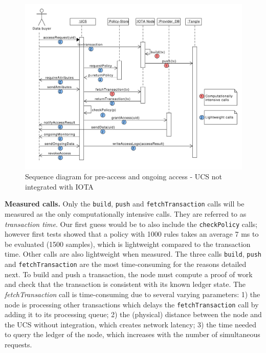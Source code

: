 \begin{figure}[ht]
\centering
 \includegraphics[width=\textwidth]{Images/sequence_iotj.pdf}
\caption{Sequence diagram for pre-access and ongoing access - UCS not integrated with IOTA}
\label{F_sequence_iotj}
\end{figure}

\textbf{Measured calls.}
Only the \texttt{build}, \texttt{push} and \texttt{fetchTransaction} calls will be measured as the only computationally intensive calls. They are referred to as \emph{transaction time}. Our first guess would be to also include
the \texttt{checkPolicy} calls; however first tests showed that a
policy with 1000 rules takes an average 7 ms to be evaluated (1500 samples), which is lightweight compared to the transaction time. Other calls are also lightweight when measured.
The three calls \texttt{build}, \texttt{push} and \texttt{fetchTransaction} are the most time-consuming for the reasons detailed next. To build and push a transaction, the node must compute a proof of work and check that the transaction is consistent with its known ledger state.
The \emph{fetchTransaction} call is time-consuming due to several varying parameters: 1) the node is processing other transactions which delays the \texttt{fetchTransaction} call by adding it to its processing queue; 2) the (physical) distance between the node and the UCS without integration, which creates network latency; 3) the time needed to query the ledger of the node, which increases with the number of simultaneous requests.

